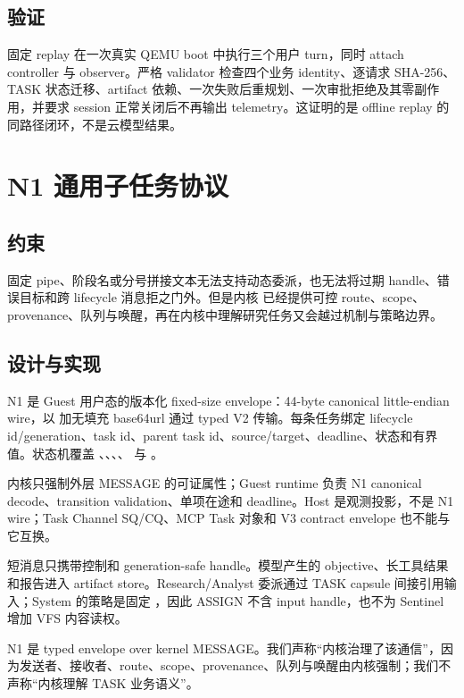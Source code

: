 \subsection{验证}

固定 replay 在一次真实 QEMU boot 中执行三个用户 turn，同时 attach controller 与 observer。严格 validator 检查四个业务 identity、逐请求 SHA-256、TASK 状态迁移、artifact 依赖、一次失败后重规划、一次审批拒绝及其零副作用，并要求 session 正常关闭后不再输出 telemetry。这证明的是 offline replay 的同路径闭环，不是云模型结果。

\section{N1 通用子任务协议}

\subsection{约束}

固定 pipe、阶段名或分号拼接文本无法支持动态委派，也无法将过期 handle、错误目标和跨 lifecycle 消息拒之门外。但是内核  已经提供可控 route、scope、provenance、队列与唤醒，再在内核中理解研究任务又会越过机制与策略边界。

\subsection{设计与实现}

N1 是 Guest 用户态的版本化 fixed-size envelope：44-byte canonical little-endian wire，以  加无填充 base64url 通过 typed V2  传输。每条任务绑定 lifecycle id/generation、task id、parent task id、source/target、deadline、状态和有界值。状态机覆盖 、、、、 与 。

内核只强制外层 MESSAGE 的可证属性；Guest runtime 负责 N1 canonical decode、transition validation、单项在途和 deadline。Host  是观测投影，不是 N1 wire；Task Channel SQ/CQ、MCP Task 对象和 V3 contract envelope 也不能与它互换。

短消息只携带控制和 generation-safe handle。模型产生的 objective、长工具结果和报告进入 artifact store。Research/Analyst 委派通过 TASK capsule 间接引用输入；System 的策略是固定 ，因此 ASSIGN 不含 input handle，也不为 Sentinel 增加 VFS 内容读权。

\begin{designbox}[层次声明]
N1 是 typed envelope over kernel MESSAGE。我们声称“内核治理了该通信”，因为发送者、接收者、route、scope、provenance、队列与唤醒由内核强制；我们不声称“内核理解 TASK 业务语义”。
\end{designbox}

